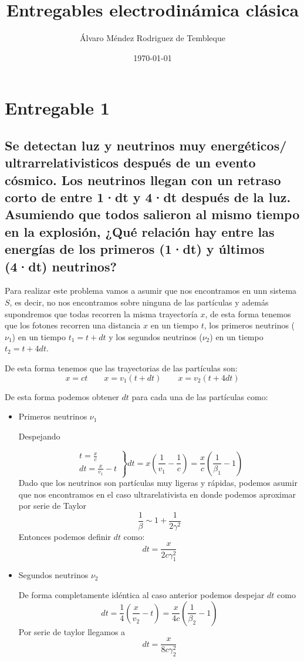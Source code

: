 \documentclass{article}
\title{Entregables electrodinámica clásica}
\author{Álvaro Méndez Rodriguez de Tembleque}
\date{\today}
\begin{document}
\maketitle

\section{Entregable 1}
\subsection{Se detectan luz y neutrinos muy energéticos/ ultrarrelativisticos después de un evento cósmico. Los neutrinos llegan con un retraso corto de entre 1·dt y 4·dt después de la luz. Asumiendo que todos salieron al mismo tiempo en la explosión, ¿Qué relación hay entre las energías de los primeros (1·dt) y últimos (4·dt) neutrinos?}
Para realizar este problema vamos a asumir que nos encontramos en unn sistema $S$, es decir, no nos encontramos sobre ninguna de las partículas y además supondremos que todas recorren la misma trayectoría $x$, de esta forma tenemos que los fotones recorren una distancia $x$ en un tiempo $t$, los primeros neutrinos ($\nu_{1}$) en un tiempo $t_{1}=t+dt$ y los segundos neutrinos ($\nu_{2}$) en un tiempo $t_{2}=t+4dt$. 

De esta forma tenemos que las trayectorias de las partículas son:
\[x=ct \qquad x=v_{1}(t+dt) \qquad x=v_{2}(t+4dt)\]

De esta forma podemos obtener $dt$ para cada una de las partículas como:
\begin{itemize}
  \item Primeros neutrinos $\nu_{1}$
  
  Despejando 
  
  \[\left.\begin{aligned}
    t=\frac{x}{c}\\
    dt=\frac{x}{v_{1}}-t
    \end{aligned}\right\}dt=x(\frac{1}{v_{1}}-\frac{1}{c})=\frac{x}{c}(\frac{1}{\beta_{1}}-1)\]
  Dado que los neutrinos son partículas muy ligeras y rápidas, podemos asumir que nos encontramos en el caso ultrarelativista en donde podemos aproximar por serie de Taylor 
  \[\frac{1}{\beta}\sim1+\frac{1}{2\gamma^{2}}\]
  Entonces podemos definir $dt$ como:
  \[dt=\frac{x}{2c\gamma_{1}^{2}}\]
  \item Segundos neutrinos $\nu_{2}$
  
  De forma completamente idéntica al caso anterior podemos despejar $dt$ como 
  \[dt=\frac{1}{4}(\frac{x}{v_{2}}-t)= \frac{x}{4c}(\frac{1}{\beta_{2}}-1)\]
  Por serie de taylor llegamos a 
  \[dt=\frac{x}{8c\gamma_{2}^{2}}\]
\end{itemize}
\end{document}
